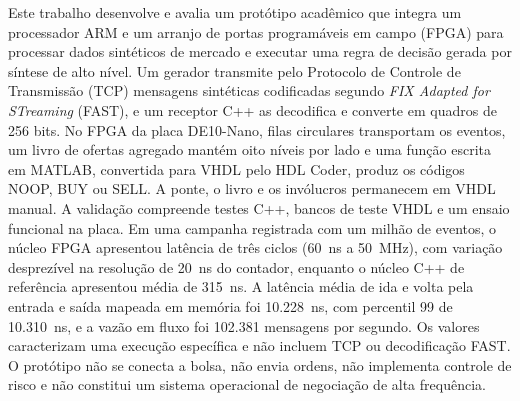 
\begin{resumoutfpr}
Este trabalho desenvolve e avalia um protótipo acadêmico que integra um processador ARM e um arranjo de portas programáveis em campo (FPGA) para processar dados sintéticos de mercado e executar uma regra de decisão gerada por síntese de alto nível. Um gerador transmite pelo Protocolo de Controle de Transmissão (TCP) mensagens sintéticas codificadas segundo \textit{FIX Adapted for STreaming} (FAST), e um receptor C++ as decodifica e converte em quadros de 256 bits. No FPGA da placa DE10-Nano, filas circulares transportam os eventos, um livro de ofertas agregado mantém oito níveis por lado e uma função escrita em MATLAB, convertida para VHDL pelo HDL Coder, produz os códigos NOOP, BUY ou SELL. A ponte, o livro e os invólucros permanecem em VHDL manual. A validação compreende testes C++, bancos de teste VHDL e um ensaio funcional na placa. Em uma campanha registrada com um milhão de eventos, o núcleo FPGA apresentou latência de três ciclos (60~ns a 50~MHz), com variação desprezível na resolução de 20~ns do contador, enquanto o núcleo C++ de referência apresentou média de 315~ns. A latência média de ida e volta pela entrada e saída mapeada em memória foi 10.228~ns, com percentil 99 de 10.310~ns, e a vazão em fluxo foi 102.381 mensagens por segundo. Os valores caracterizam uma execução específica e não incluem TCP ou decodificação FAST. O protótipo não se conecta a bolsa, não envia ordens, não implementa controle de risco e não constitui um sistema operacional de negociação de alta frequência.
\end{resumoutfpr}
